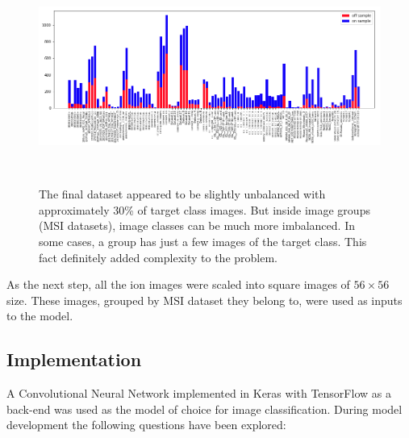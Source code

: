 \documentclass[a4paper]{article}
\begin{document}
    \begin{figure}[H]
        \centering
            \includegraphics[width=\textwidth,height=7cm]{class_distribution.png}
        \caption{The final dataset appeared to be slightly unbalanced with approximately 30\%
        of target class images. But inside image groups (MSI datasets),
        image classes can be much more imbalanced.
        In some cases, a group has just a few images of the target class.
        This fact definitely added complexity to the problem.}
    \end{figure}
    
    As the next step, all the ion images were scaled into square images of $56 \times 56$ size.
    These images, grouped by MSI dataset they belong to, were used as inputs to the model.
    
    \subsection*{Implementation}
    
    A Convolutional Neural Network implemented in Keras with TensorFlow as a back-end was used as the model
    of choice for image classification. During model development the following questions have been explored:
    
\end{document}
